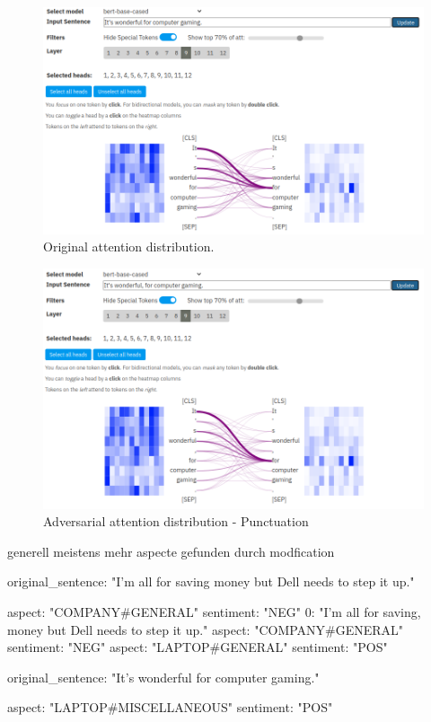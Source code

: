 \begin{figure}
    \centering
    \includegraphics[width =.8\textwidth]{img/attention_punctuation_original.png}
    \caption{Original attention distribution.}
    \label{fig:attention_punct_original}
\end{figure}

\begin{figure}
    \centering
    \includegraphics[width =.8\textwidth]{img/attention_punctuation_modified.png}
    \caption{Adversarial attention distribution - Punctuation}
    \label{fig:attention_punct_modified}
\end{figure}

generell meistens mehr aspecte gefunden durch modfication

original_sentence: "I'm all for saving money but Dell needs to step it up."

    aspect: "COMPANY#GENERAL"
    sentiment: "NEG"
0: "I'm all for saving, money but Dell needs to step it up."
aspect: "COMPANY#GENERAL"
sentiment: "NEG"
aspect: "LAPTOP#GENERAL"
sentiment: "POS"


original_sentence: "It's wonderful for computer gaming."

    aspect: "LAPTOP#MISCELLANEOUS"
    sentiment: "POS"


